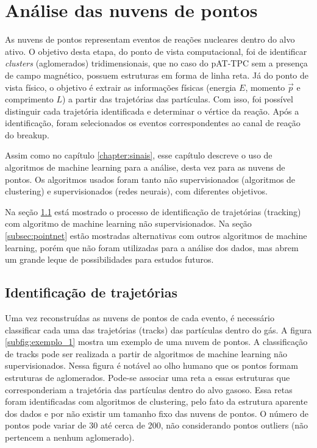 \documentclass[a4paper,12pt,oneside]{book}
\begin{document}
\chapter{Análise das nuvens de pontos}\label{chapter:point_cloud_analysis}

\par As nuvens de pontos representam eventos de reações nucleares dentro do alvo ativo. O objetivo desta etapa, do ponto de vista computacional, foi de identificar \textit{clusters} (aglomerados) tridimensionais, que no caso do pAT-TPC sem a presença de campo magnético, possuem estruturas em forma de linha reta. Já do ponto de vista físico, o objetivo é extrair as informações físicas (energia $E$, momento $\vec{p}$ e comprimento $L$) a partir das trajetórias das partículas. Com isso, foi possível distinguir cada trajetória identificada e determinar o vértice da reação. Após a identificação, foram selecionados os eventos correspondentes ao canal de reação do breakup.

\par Assim como no capítulo \ref{chapter:sinais}, esse capítulo descreve o uso de algoritmos de machine learning para a análise, desta vez para as nuvens de pontos. Os algoritmos usados foram tanto não supervisionados (algoritmos de clustering) e supervisionados (redes neurais), com diferentes objetivos.

\par Na seção \ref{sec:forcabruta} está mostrado o processo de identificação de trajetórias (tracking) com algoritmo de machine learning não supervisionados. Na seção \ref{subsec:pointnet} estão mostradas alternativas com outros algoritmos de machine learning, porém que não foram utilizadas para a análise dos dados, mas abrem um grande leque de possibilidades para estudos futuros.



\section{Identificação de trajetórias}\label{sec:forcabruta}

\par Uma vez reconstruídas as nuvens de pontos de cada evento, é necessário classificar cada uma das trajetórias (tracks) das partículas dentro do gás. A figura \ref{subfig:exemplo_1} mostra um exemplo de uma nuvem de pontos. A classificação de tracks pode ser realizada a partir de algoritmos de machine learning não supervisionados. Nessa figura é notável ao olho humano que os pontos formam estruturas de aglomerados. Pode-se associar uma reta a essas estruturas que corresponderiam a trajetória das partículas dentro do alvo gasoso. Essa retas foram identificadas com algoritmos de clustering, pelo fato da estrutura aparente dos dados e por não existir um tamanho fixo das nuvens de pontos. O número de pontos pode variar de 30 até cerca de 200, não considerando pontos outliers (não pertencem a nenhum aglomerado).
\end{document}
